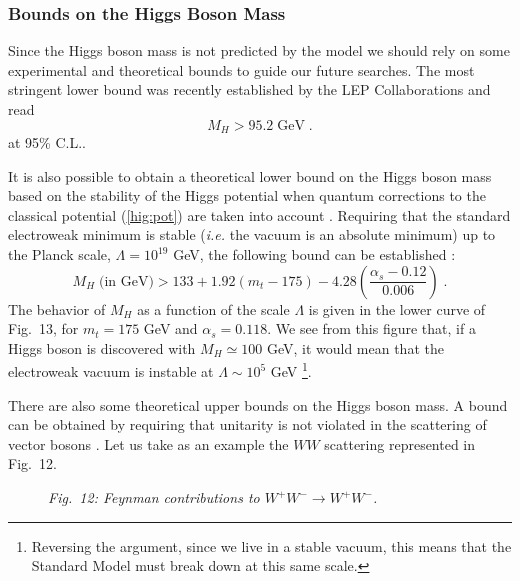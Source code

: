 \documentclass[12pt]{report}
\begin{document}
\subsubsection{Bounds on the Higgs Boson Mass} \indent

Since the Higgs boson mass is not predicted by the model we should
rely on some experimental and theoretical bounds to guide our future
searches. The most stringent lower bound was recently established by the LEP
Collaborations \cite{Higgs:99} and read
\[
M_H > 95.2 \; \mbox{GeV} \; . 
\]
at 95\% C.L..

It is also possible to obtain a theoretical lower bound on the Higgs
boson mass based on the stability of the Higgs potential when 
quantum corrections to the classical potential (\ref{hig:pot}) are
taken into account \cite{Sher:89}.  Requiring that the standard
electroweak minimum is stable ({\it i.e.} the vacuum is an absolute
minimum) up to the Planck scale, $\Lambda = 10^{19}$ GeV, the
following bound can be established \cite{Casas:95}:
\[
M_H \; \mbox {(in GeV)} > 133 + 1.92 (m_t - 175) - 
4.28 \left(\frac{\alpha_s - 0.12}{0.006} \right)\; .
\]
The behavior of $M_H$ as a function of the scale $\Lambda$ is given
in the lower curve of Fig.\ 13, for $m_t=175$ GeV and $\alpha_s =
0.118$. We see from this figure that, if a Higgs boson is discovered
with $M_H \simeq 100$ GeV, it would mean that the electroweak vacuum
is instable at $\Lambda \sim 10^5$ GeV \footnote{Reversing the
argument, since we live in a stable vacuum, this means that the
Standard Model must break down at this same scale.}.


There are also some theoretical upper bounds on the Higgs boson mass.
A bound can be obtained by requiring that unitarity is not violated in
the scattering of vector bosons \cite{Lee:77}. Let us take as an
example the $WW$ scattering represented in Fig.\ 12. 

\begin{figure}[ht]
\protect
\epsfxsize=10cm
\begin{center}
\mbox{}
\end{center}
\begin{center}
\begin{minipage}[h]{12cm}
\begin{center}
{\it Fig.\ 12: Feynman contributions to $W^+ W^- \to W^+ W^-$.}
\end{center}
\end{minipage}
\end{center}
\end{figure}
\end{document}
